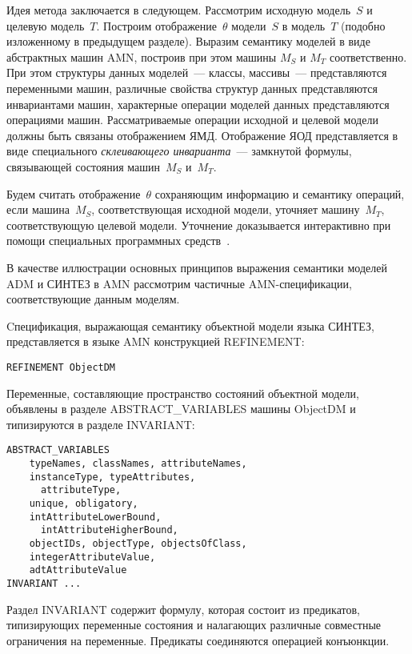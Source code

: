 \begin{multicols}{2}
{}
        
        Идея метода заключается в следующем. Рассмотрим исходную 
модель~$S$ и целевую модель~$T$. Построим отображение~$\theta$ 
модели~$S$ в модель~$T$ (подобно изложенному в предыдущем разделе). 
Выразим семантику моделей в виде абстрактных машин AMN, построив при 
этом машины $M_S$ и $M_T$ соответственно. При этом структуры данных 
моделей~--- классы, массивы~--- представляются переменными машин, 
различные свойства структур данных представляются инвариантами машин, 
характерные операции моделей данных представляются операциями машин. 
Рассматриваемые операции исходной и целевой модели должны быть связаны 
отображением ЯМД. Отображение ЯОД представляется в виде специального 
\textit{склеивающего инварианта}~--- замкнутой формулы, связывающей 
состояния машин~$M_S$ и~$M_T$.
        
        Будем считать отображение~$\theta$ сохраняющим инфор\-ма\-цию и 
семантику операций, если машина~$M_S$, соответствующая исходной модели, 
уточняет машину~$M_T$, соответствующую целевой модели. Уточнение 
доказывается интерактивно при помощи специальных программных 
средств~\cite{22-stu}.
        
        \smallskip
        
        В качестве иллюстрации основных принципов выражения семантики 
моделей ADM и СИНТЕЗ в AMN рассмотрим частичные 
        AMN-спе\-ци\-фи\-ка\-ции, соответствующие данным моделям.
        
        Cпецификация, выражающая семантику объектной модели языка 
СИНТЕЗ, представляется в языке AMN конструкцией {\sf REFINEMENT}:
\begin{verbatim}
REFINEMENT ObjectDM
\end{verbatim}

        Переменные, составляющие пространство состояний объектной модели, 
объявлены в разделе {\sf ABSTRACT\_VARIABLES} машины {\sf ObjectDM} и 
типизируются в разделе {\sf INVARIANT}:
\begin{verbatim}
ABSTRACT_VARIABLES
    typeNames, classNames, attributeNames,
    instanceType, typeAttributes, 
      attributeType,
    unique, obligatory,
    intAttributeLowerBound, 
      intAttributeHigherBound,
    objectIDs, objectType, objectsOfClass,
    integerAttributeValue,
    adtAttributeValue
INVARIANT ...
\end{verbatim}

        Раздел {\sf INVARIANT} содержит формулу, которая состоит из предикатов, 
типизирующих переменные состояния и налагающих различные совместные 
ограничения на переменные. Предикаты соединяются операцией конъюнкции.
        

\end{multicols}
